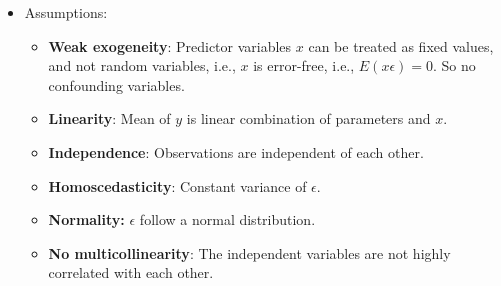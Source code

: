 \begin{itemize}
\item 
Assumptions:
	\begin{itemize}
	\item \textbf{Weak exogeneity}: Predictor variables $x$ can be treated as fixed values, and not random variables, i.e., $x$ is error-free, i.e., $E(x\epsilon) = 0.$ So no confounding variables.
	
	\item \textbf{Linearity}: Mean of $y$ is linear combination of parameters and $x.$
	
	\item \textbf{Independence}: Observations are independent of each other.
		
	\item \textbf{Homoscedasticity}: Constant variance of $\epsilon.$
	
	\item \textbf{Normality:} $\epsilon$ follow a normal distribution.
	
	\item \textbf{No multicollinearity}: The independent variables are not highly correlated with each other.
	\end{itemize}

\end{itemize}